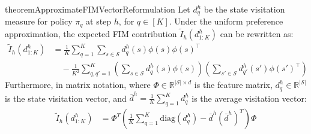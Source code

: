 \documentclass{article}
\newcommand{\Scal}{\mathcal{S}}
\begin{document}
\begin{restatable}{theorem}{ApproximateFIMVectorReformulation}
\label{theorem:approx-fim-vector-measure}
Let $d^h_q$ be the state visitation measure for policy $\pi_q$ at step $h$, for $q \in [K]$. Under the uniform preference approximation, the expected FIM contribution $\tilde{I}_h(d_{1:K}^h)$ can be rewritten as:
\[
\begin{aligned}
\tilde{I}_h(d_{1:K}^h)
&= \frac{1}{K} \sum_{q=1}^K \sum_{s \in \Scal} d^h_q(s) \phi(s)\phi(s)^\top \\
&\quad - \frac{1}{K^2} \sum_{q,q'=1}^K \left( \sum_{s \in \Scal} d^h_q(s) \phi(s) \right) \left( \sum_{s' \in \Scal} d^h_{q'}(s') \phi(s')^\top \right)
\end{aligned}
\]
Furthermore, in matrix notation, where $\Phi \in \mathbb{R}^{|\Scal| \times d}$ is the feature matrix, $d^h_q \in \mathbb{R}^{|\Scal|}$ is the state visitation vector, and $\bar{d}^h = \frac{1}{K} \sum_{q=1}^K d^h_q$ is the average visitation vector:
\begin{align}
\label{eq:approx-fim-matrix-form}
\tilde{I}_h(d_{1:K}^h)
&= \Phi^T \left( \frac{1}{K} \sum_{q=1}^K \mathrm{diag}(d^h_q) - \bar{d}^h (\bar{d}^h)^T \right) \Phi
\end{align}
\end{restatable}
\end{document}
